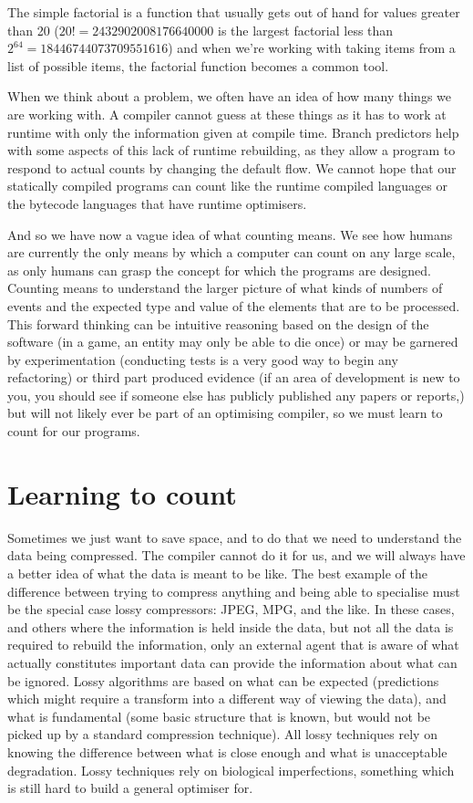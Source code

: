 The simple factorial is a function that usually gets out of hand for values
greater than 20 ($20! = 2432902008176640000$ is the
largest factorial less than $2^{64} = 18446744073709551616$) and when we're
working with taking items from a list of possible items, the factorial function
becomes a common tool.

When we think about a problem, we often have an idea of how many things we are
working with. A compiler cannot guess at these things as it has to work at
runtime with only the information given at compile time. Branch predictors
help with some aspects of this lack of runtime rebuilding, as they allow a
program to respond to actual counts by changing the default flow. We cannot
hope that our statically compiled programs can count like the runtime compiled
languages or the bytecode languages that have runtime optimisers.

And so we have now a vague idea of what counting means. We see how humans are
currently the only means by which a computer can count on any large scale, as
only humans can grasp the concept for which the programs are designed.
Counting means to understand the larger picture of what kinds of numbers of
events and the expected type and value of the elements that are to be
processed. This forward thinking can be intuitive reasoning based on the design
of the software (in a game, an entity may only be able to die once) or may be
garnered by experimentation (conducting tests is a very good way to begin any
refactoring) or third part produced evidence (if an area of development is new
to you, you should see if someone else has publicly published any papers or
reports,) but will not likely ever be part of an optimising compiler, so we
must learn to count for our programs.

\section{Learning to count}

Sometimes we just want to save space, and to do that we need to understand the
data being compressed. The compiler cannot do it for us, and we will always
have a better idea of what the data is meant to be like. The best example of
the difference between trying to compress anything and being able to specialise
must be the special case lossy compressors: JPEG, MPG, and the like. In these
cases, and others where the information is held inside the data, but not all
the data is required to rebuild the information, only an external agent that is
aware of what actually constitutes important data can provide the information
about what can be ignored. Lossy algorithms are based on what can be expected
(predictions which might require a transform into a different way of viewing
the data), and what is fundamental (some basic structure that is known, but
would not be picked up by a standard compression technique). All lossy
techniques rely on knowing the difference between what is close enough and what
is unacceptable degradation. Lossy techniques rely on biological imperfections,
something which is still hard to build a general optimiser for.

